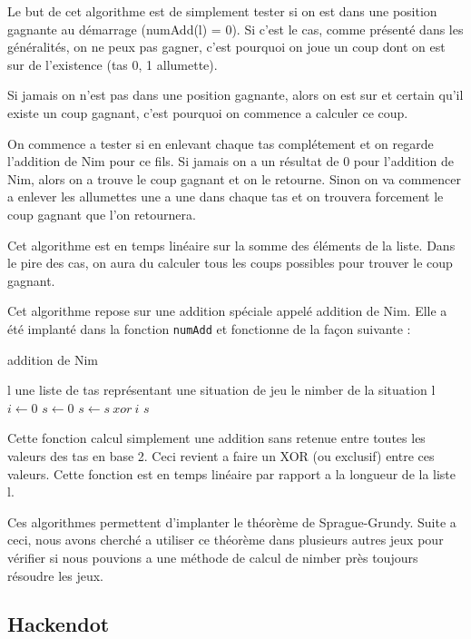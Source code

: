 Le but de cet algorithme est de simplement tester si on est dans une position gagnante au démarrage (numAdd(l) = 0). Si c'est le cas, comme présenté dans les généralités, on ne peux pas gagner, c'est pourquoi on joue un coup dont on est sur de l'existence (tas 0, 1 allumette).

Si jamais on n'est pas dans une position gagnante, alors on est sur et certain qu'il existe un coup gagnant, c'est pourquoi on commence a calculer ce coup.

On commence a tester si en enlevant chaque tas complétement et on regarde l'addition de Nim pour ce fils. Si jamais on a un résultat de 0 pour l'addition de Nim, alors on a trouve le coup gagnant et on le retourne. Sinon on va commencer a enlever les allumettes une a une dans chaque tas et on trouvera forcement le coup gagnant que l'on retournera.

Cet algorithme est en temps linéaire sur la somme des éléments de la liste. Dans le pire des cas, on aura du calculer tous les coups possibles pour trouver le coup gagnant.

Cet algorithme repose sur une addition spéciale appelé addition de Nim. Elle a été implanté dans la fonction \texttt{numAdd} et fonctionne de la façon suivante :

\begin{algorithm}[hbt]
  \caption{addition de Nim}
  \begin{algorithmic}[h]
    \REQUIRE l une liste de tas représentant une situation de jeu
    \ENSURE le nimber de la situation l
    \STATE $i \leftarrow 0$
    \STATE $s \leftarrow 0$
      \STATE $s \leftarrow s\ xor\ i$
    \ENDFOR
    \RETURN $s$
  \end{algorithmic}
\end{algorithm}

Cette fonction calcul simplement une addition sans retenue entre toutes les valeurs des tas en base 2. Ceci revient a faire un XOR (ou exclusif) entre ces valeurs. Cette fonction est en temps linéaire par rapport a la longueur de la liste l.

Ces algorithmes permettent d'implanter le théorème de Sprague-Grundy. Suite a ceci, nous avons cherché a utiliser ce théorème dans plusieurs autres jeux pour vérifier si nous pouvions a une méthode de calcul de nimber près toujours résoudre les jeux.

\subsection{Hackendot}
\label{sub:Hackendot}

